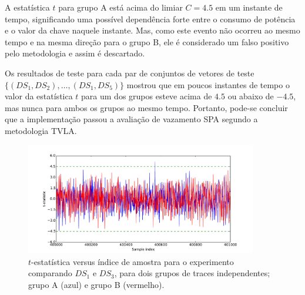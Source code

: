 A estatística $t$ para grupo A está acima do limiar $C = 4.5$ em um instante de tempo, significando uma possível dependência forte entre o consumo de potência e o valor da chave naquele instante. Mas, como este evento não ocorreu ao mesmo tempo e na mesma direção para o grupo B, ele é considerado um falso positivo pelo metodologia e assim é descartado.
%
%

Os resultados de teste para cada par de conjuntos de vetores de teste $ \{(DS_1,DS_2), \dots, (DS_1,DS_5) \}$ mostrou que em poucos instantes de tempo o valor da estatística $t$ para um dos grupos esteve acima de $4.5$ ou abaixo de $-4.5$, mas nunca para ambos os grupos ao mesmo tempo.
%
Portanto, pode-se concluir que a implementação passou a avaliação de vazamento SPA segundo a metodologia TVLA.

\begin{figure}[htb]
	\centering
	\centerline{
		\includegraphics[width=0.9\textwidth]{figures/graph__t_statistic__x__sample_index_for_groups_A_and_B__pair_DS1_DS3-eps-converted-to.pdf}
	}
	\caption{
		$t$-estatística versus índice de amostra para o experimento comparando $DS_1$ e $DS_3$, para dois grupos de traces independentes; grupo A (azul) e grupo B (vermelho).
	}
	\label{fig:graphtstat}
\end{figure}
